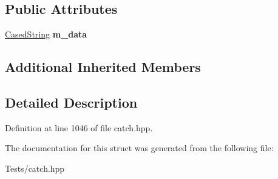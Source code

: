 \subsection*{Public Attributes}
\begin{DoxyCompactItemize}
\item 
\mbox{\label{struct_catch_1_1_matchers_1_1_impl_1_1_std_string_1_1_contains_a419a9ecaeaa417d4987982402e08b3eb}} 
\hyperlink{struct_catch_1_1_matchers_1_1_impl_1_1_std_string_1_1_cased_string}{Cased\+String} {\bfseries m\+\_\+data}
\end{DoxyCompactItemize}
\subsection*{Additional Inherited Members}


\subsection{Detailed Description}


Definition at line 1046 of file catch.\+hpp.



The documentation for this struct was generated from the following file\+:\begin{DoxyCompactItemize}
\item 
Tests/catch.\+hpp\end{DoxyCompactItemize}
